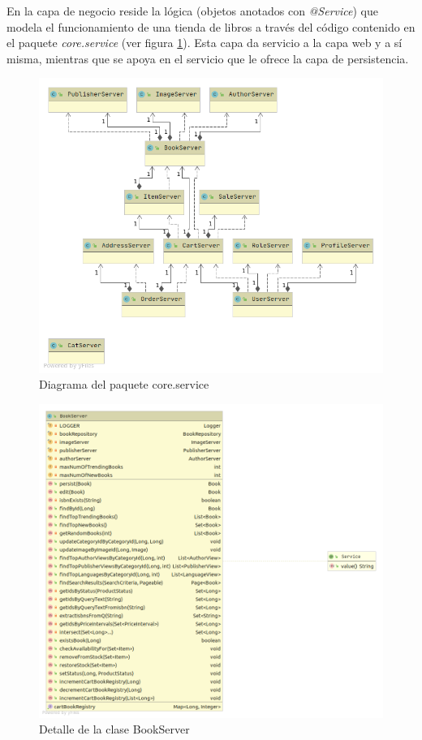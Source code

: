 \documentclass[a4paper,12pt,twoside,openright]{report}
\begin{document}
   	En la capa de negocio reside la lógica (objetos anotados con \emph{@Service}) que modela el funcionamiento de una tienda de libros a través del código contenido en el paquete \emph{core.service} (ver figura \ref{fig:package_service}). Esta capa da servicio a la capa web y a sí misma, mientras que se apoya en el servicio que le ofrece la capa de persistencia.
    	
   	\begin{figure}[htb!]
		\centering
		\includegraphics[width=\textwidth,keepaspectratio]{package_service}
		\caption{Diagrama del paquete core.service}
		\label{fig:package_service}
	\end{figure}

	\begin{figure}[htb!]
		\centering
		\includegraphics[width=\textwidth,keepaspectratio]{detail_bookServer}
		\caption{Detalle de la clase BookServer}
		\label{fig:detail_bookServer}
	\end{figure}
\end{document}
